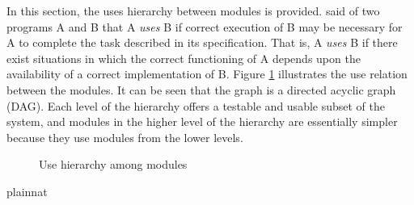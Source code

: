 \documentclass[12pt, titlepage]{article}
\begin{document}
In this section, the uses hierarchy between modules is
provided. \citet{Parnas1978} said of two programs A and B that A {\em uses} B if
correct execution of B may be necessary for A to complete the task described in
its specification. That is, A {\em uses} B if there exist situations in which
the correct functioning of A depends upon the availability of a correct
implementation of B.  Figure \ref{FigUH} illustrates the use relation between
the modules. It can be seen that the graph is a directed acyclic graph
(DAG). Each level of the hierarchy offers a testable and usable subset of the
system, and modules in the higher level of the hierarchy are essentially simpler
because they use modules from the lower levels.

\begin{figure}[H]
\centering

\caption{Use hierarchy among modules}
\label{FigUH}
\end{figure}

\newpage{}

 {plainnat}

\end{document}
